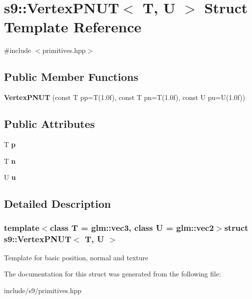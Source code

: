 \hypertarget{structs9_1_1VertexPNUT}{\section{s9\-:\-:Vertex\-P\-N\-U\-T$<$ T, U $>$ Struct Template Reference}
\label{structs9_1_1VertexPNUT}
}


{\ttfamily \#include $<$primitives.\-hpp$>$}

\subsection*{Public Member Functions}
\begin{DoxyCompactItemize}
\item 
\hypertarget{structs9_1_1VertexPNUT_ae31bedc31b1522090d92ffd21e715148}{{\bfseries Vertex\-P\-N\-U\-T} (const T pp=T(1.\-0f), const T pn=\-T(1.\-0f), const U pu=\-U(1.\-0f))}\label{structs9_1_1VertexPNUT_ae31bedc31b1522090d92ffd21e715148}

\end{DoxyCompactItemize}
\subsection*{Public Attributes}
\begin{DoxyCompactItemize}
\item 
\hypertarget{structs9_1_1VertexPNUT_a5b7dd3f6950903a2fa045047ccb213db}{T {\bfseries p}}\label{structs9_1_1VertexPNUT_a5b7dd3f6950903a2fa045047ccb213db}

\item 
\hypertarget{structs9_1_1VertexPNUT_a29dfcd01e62eb9f30647aef61c9eb0a3}{T {\bfseries n}}\label{structs9_1_1VertexPNUT_a29dfcd01e62eb9f30647aef61c9eb0a3}

\item 
\hypertarget{structs9_1_1VertexPNUT_ace59717fc9d5e33045fa56331a2cfe7a}{U {\bfseries u}}\label{structs9_1_1VertexPNUT_ace59717fc9d5e33045fa56331a2cfe7a}

\end{DoxyCompactItemize}


\subsection{Detailed Description}
\subsubsection*{template$<$class T = glm\-::vec3, class U = glm\-::vec2$>$struct s9\-::\-Vertex\-P\-N\-U\-T$<$ T, U $>$}

Template for basic position, normal and texture 

The documentation for this struct was generated from the following file\-:\begin{DoxyCompactItemize}
\item 
include/s9/primitives.\-hpp\end{DoxyCompactItemize}
